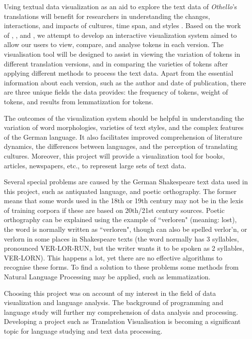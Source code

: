 Using textual data visualization as an aid to explore the text data of \emph{Othello}’s translations will  benefit for researchers in understanding the changes, interactions, and impacts of cultures, time span, and styles \cite{Alrehiely2014}. Based on the work of \cite{Geng2015}, \cite{Alrehiely2014}, and \cite{Tom2012}, we attempt to develop an interactive visualization system aimed to allow our users to view, compare, and analyse tokens in each version. The visualisation tool will be designed to assist in viewing the variation of tokens in different translation versions, and in comparing the varieties of tokens after applying different methods to process the text data.  Apart from the essential information about each version, such as the author and date of publication, there are three unique fields the data provides: the frequency of tokens, weight of tokens, and results from lemmatization for tokens.

The outcomes of the visualization system should be helpful in understanding the variation of word morphologies, varieties of text styles, and the complex features of the German language. It also facilitates improved comprehension of literature dynamics, the differences between languages, and the perception of translating cultures. Moreover, this project will provide a visualization tool for books, articles, newspapers, etc., to represent large sets of text data.  

Several special problems are caused by the German Shakespeare text data used in this project, such as antiquated language, and poetic orthography.  The former means that some words used in the 18th or 19th century may not be in the lexis of training corpora if these are based on 20th/21st century sources. Poetic orthography can be explained using the example of “verloren" (meaning: lost), the word is normally written as “verloren", though can also be spelled verlor’n, or verlorn in some places in Shakespeare texts (the word normally has 3 syllables, pronounced VER-LOR-RUN, but the writer wants it to be spoken as 2 syllables, VER-LORN). This happens a lot, yet there are no effective algorithms to recognise these forms. To find a solution to these problems some methods from Natural Language Processing may be applied, such as lemmatization.


Choosing this project was on account of my interest in the field of data visualization and language analysis. The background of programming and language study will further my comprehension of data analysis and processing. Developing a project such as Translation Visualisation is becoming a significant topic for language studying and text data processing.

